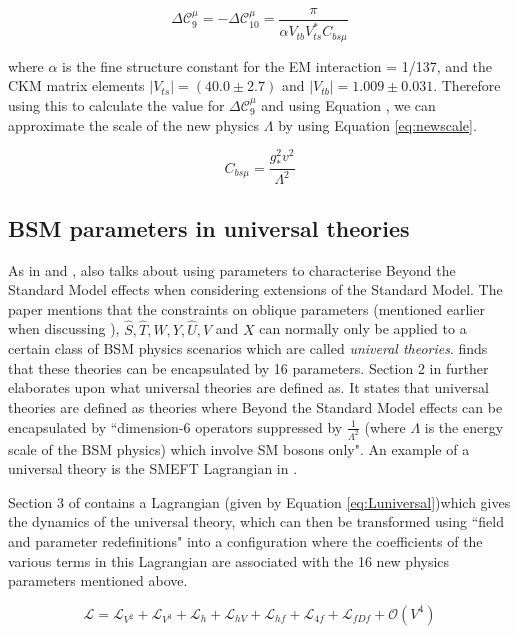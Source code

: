 \documentclass[11pt,oneside,a4paper]{article}
\begin{document}
\begin{equation}
\label{eq:deltaC}
\Delta\mathcal{C}^{\mu}_{9} = -\Delta\mathcal{C}^{\mu}_{10} = \frac{\pi}{\alpha V_{tb} V^{*}_{ts}C_{bs\mu}}
\end{equation}	


where $\alpha$ is the fine structure constant for the EM interaction = 1/137, and the CKM matrix elements $|V_{ts}| = (40.0 \pm 2.7)$ and $|V_{tb}| = 1.009 \pm 0.031$. Therefore using this to calculate the value for $\Delta\mathcal{C}^{\mu}_{9}$ and using Equation \label{eq:deltaC}, we can approximate the scale of the new physics $\Lambda$ by using Equation \ref{eq:newscale}.

\begin{equation}
\label{eq:newscale}
C_{bs\mu} = \frac{g^2_{*}v^2}{\Lambda^{2}}
\end{equation}

\subsection{BSM parameters in universal theories}
As in \cite{EWprecision} and \cite{highptdilepton}, \cite{universal} also talks about using parameters to characterise Beyond the Standard Model effects when considering extensions of the Standard Model. The paper mentions that the constraints on oblique parameters (mentioned earlier when discussing \cite{EWprecision}), $\hat{S}, \hat{T}, W, Y, \hat{U}, V$ and $X$ can normally only be applied to a certain class of BSM physics scenarios which are called \textit{univeral theories}. \cite{universal} finds that these theories can be encapsulated by 16 parameters. Section 2 in \cite{universal} further elaborates upon what universal theories are defined as. It states that universal theories are defined as theories where Beyond the Standard Model effects can be encapsulated by ``dimension-6 operators suppressed by $\frac{1}{\Lambda^{2}}$ (where $\Lambda$ is the energy scale of the BSM physics) which involve SM bosons only". An example of a universal theory is the SMEFT Lagrangian in \cite{highptdilepton}.

Section 3 of \cite{universal} contains a Lagrangian (given by Equation \ref{eq:Luniversal})which gives the dynamics of the universal theory, which can then be transformed using ``field and parameter redefinitions" into a configuration where the coefficients of the various terms in this Lagrangian are associated with the 16 new physics parameters mentioned above. 

\begin{equation}
\label{eq:Luniversal}
\mathcal{L} = \mathcal{L}_{V^{2}} + \mathcal{L}_{V^{3}} + \mathcal{L}_{h} + \mathcal{L}_{hV} + \mathcal{L}_{hf} + \mathcal{L}_{4f} + \mathcal{L}_{fDf} + \mathcal{O}(V^{4})
\end{equation}
\end{document}
